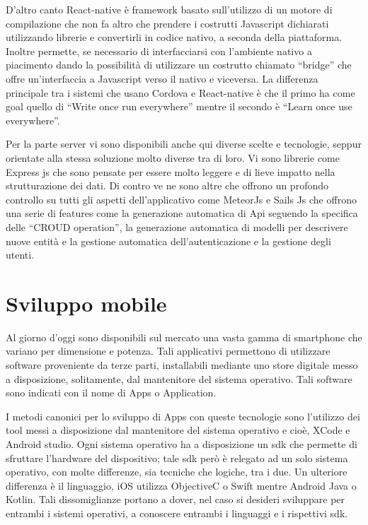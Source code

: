 D’altro canto React-native è framework basato sull’utilizzo di un motore di compilazione che non fa altro che prendere i costrutti Javascript dichiarati utilizzando librerie e convertirli in codice nativo, a seconda della piattaforma. Inoltre permette, se necessario di interfacciarsi con l’ambiente nativo a piacimento dando la possibilità di utilizzare un costrutto chiamato “bridge” che offre un’interfaccia a Javascript verso il nativo e viceversa. La differenza principale tra i sistemi che usano Cordova e React-native è che il primo ha come goal quello di “Write once run everywhere” mentre il secondo è “Learn once use everywhere”.\vspace{5mm}

Per la parte server vi sono disponibili anche qui diverse scelte e tecnologie, seppur orientate alla stessa soluzione molto diverse tra di loro. Vi sono librerie come Express js che sono pensate per essere molto leggere e di lieve impatto nella strutturazione dei dati. Di contro ve ne sono altre che offrono un profondo controllo su tutti gli aspetti dell’applicativo come MeteorJs e Sails Js che offrono una serie di features come la generazione automatica di Api seguendo la specifica delle “CROUD operation”, la generazione automatica di modelli per descrivere nuove entità e la gestione automatica dell’autenticazione e la gestione degli utenti.\vspace{5mm}

\section{Sviluppo mobile}\vspace{5mm}

Al giorno d'oggi sono disponibili sul mercato una vasta gamma di smartphone che variano per dimensione e potenza. Tali applicativi permettono di utilizzare software proveniente da terze parti, installabili mediante uno store digitale messo a disposizione, solitamente, dal mantenitore del sistema operativo. Tali software sono indicati con il nome di Apps o Application.\vspace{5mm}

I metodi canonici per lo sviluppo di Apps con queste tecnologie sono l'utilizzo dei tool messi a disposizione dal mantenitore del sistema operativo e cioè, XCode e Android studio. Ogni sistema operativo ha a disposizione un sdk che permette di sfruttare l'hardware del dispositivo; tale sdk però è relegato ad un solo sistema operativo, con molte differenze, sia tecniche che logiche, tra i due. Un ulteriore differenza è il linguaggio, iOS utilizza ObjectiveC o Swift mentre Android Java o Kotlin. Tali dissomiglianze portano a dover, nel caso si desideri sviluppare per entrambi i sistemi operativi, a conoscere entrambi i linguaggi e i rispettivi sdk.\vspace{5mm}

